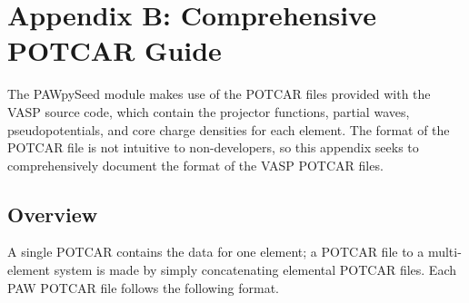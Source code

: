 \documentclass[12pt]{article}
\begin{document}
\section*{Appendix B: Comprehensive POTCAR Guide}
The PAWpySeed module makes use of the POTCAR files provided with the VASP source code, which
contain the projector functions, partial waves, pseudopotentials, and core charge densities
for each element. The format of the POTCAR file is not intuitive to non-developers, so this
appendix seeks to comprehensively document the format of the VASP POTCAR files.

\subsection*{Overview}
A single POTCAR contains the data for one element; a POTCAR file to a multi-element system
is made by simply concatenating elemental POTCAR files. Each PAW POTCAR file follows
the following format.
\end{document}
